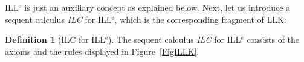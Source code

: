 \documentclass[a4paper]{article}
\theoremstyle{definition}
\newtheorem{definition}{Definition}[section]
\theoremstyle{theorem}
\theoremstyle{remark}
\begin{document}
ILL$^{\text{e}}$ is just an auxiliary concept as explained below.
Next, let us introduce a sequent calculus \emph{\textsf{ILC}} for ILL$^{\text{e}}$, which is the corresponding fragment of \textsf{LLK}: %
\begin{definition}[\textsf{ILC} for ILL$^{\text{e}}$]
\label{DefILC}
The sequent calculus \emph{\textsf{ILC}} for ILL$^{\text{e}}$ consists of the axioms and the rules displayed in Figure~\ref{FigILLK}.
\begin{figure}
\end{figure}
\end{definition}
\end{document}
